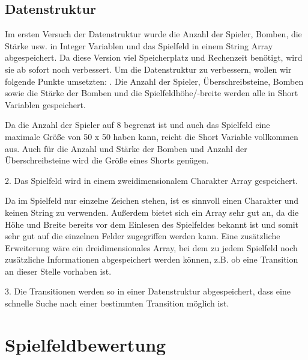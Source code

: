 \documentclass[12pt,a4paper,bibliography=totocnumbered,listof=totocnumbered]{scrartcl}
\begin{document}
    \subsection{Datenstruktur}
    Im ersten Versuch der Datenstruktur wurde die Anzahl der Spieler, Bomben, die Stärke usw. in Integer Variablen und das Spielfeld in einem String Array abgespeichert. Da diese Version viel Speicherplatz und Rechenzeit benötigt, wird sie ab sofort noch verbessert.
    Um die Datenstruktur zu verbessern, wollen wir folgende Punkte umsetzten:
    . Die Anzahl der Spieler, Überschreibsteine, Bomben sowie die Stärke der Bomben und die Spielfeldhöhe/-breite werden alle in Short Variablen gespeichert.

    Da die Anzahl der Spieler auf 8 begrenzt ist und auch das Spielfeld eine maximale Größe von 50 x 50 haben kann, reicht die Short Variable vollkommen aus. Auch für die Anzahl und Stärke der Bomben und Anzahl der Überschreibsteine wird die Größe eines Shorts genügen.

    2. Das Spielfeld wird in einem zweidimensionalem Charakter Array gespeichert.

    Da im Spielfeld nur einzelne Zeichen stehen, ist es sinnvoll einen Charakter und keinen String zu verwenden. Außerdem bietet sich ein Array sehr gut an, da die Höhe und Breite bereits vor dem Einlesen des Spielfeldes bekannt ist und somit sehr gut auf die einzelnen Felder zugegriffen werden kann.
    Eine zusätzliche Erweiterung wäre ein dreidimensionales Array, bei dem zu jedem Spielfeld noch zusätzliche Informationen abgespeichert werden können, z.B. ob eine Transition an dieser Stelle vorhaben ist.

    3. Die Transitionen werden so in einer Datenstruktur abgespeichert, dass eine schnelle Suche nach einer bestimmten Transition möglich ist.


    \newpage
    \section{Spielfeldbewertung}
\end{document}
